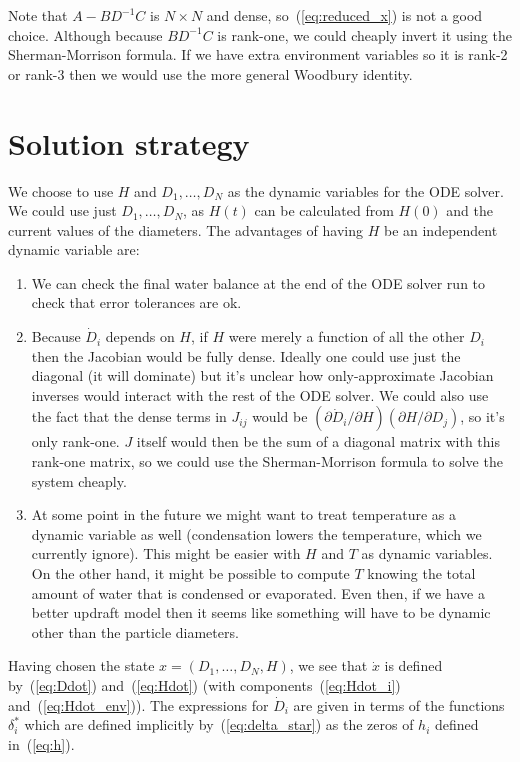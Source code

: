 \documentclass{article}
\begin{document}
Note that $A - B D^{-1} C$ is $N \times N$ and dense,
so~(\ref{eq:reduced_x}) is not a good choice. Although because $B
D^{-1} C$ is rank-one, we could cheaply invert it using the
Sherman-Morrison formula. If we have extra environment variables so it
is rank-2 or rank-3 then we would use the more general Woodbury
identity.

\section{Solution strategy}
\label{sec:solution-strategy}

We choose to use $H$ and $D_1,\ldots,D_N$ as the dynamic variables for
the ODE solver. We could use just $D_1,\ldots,D_N$, as $H(t)$ can be
calculated from $H(0)$ and the current values of the diameters. The
advantages of having $H$ be an independent dynamic variable are:
\begin{enumerate}
\item We can check the final water balance at the end of the ODE
  solver run to check that error tolerances are ok.
\item Because $\dot{D}_i$ depends on $H$, if $H$ were merely a
  function of all the other $D_i$ then the Jacobian would be fully
  dense. Ideally one could use just the diagonal (it will dominate)
  but it's unclear how only-approximate Jacobian inverses would
  interact with the rest of the ODE solver. We could also use the fact
  that the dense terms in $J_{ij}$ would be $(\partial \dot{D}_i
  / \partial H) (\partial H / \partial D_j)$, so it's only
  rank-one. $J$ itself would then be the sum of a diagonal matrix with
  this rank-one matrix, so we could use the Sherman-Morrison formula
  to solve the system cheaply.
\item At some point in the future we might want to treat temperature
  as a dynamic variable as well (condensation lowers the temperature,
  which we currently ignore). This might be easier with $H$ and $T$ as
  dynamic variables. On the other hand, it might be possible to
  compute $T$ knowing the total amount of water that is condensed or
  evaporated. Even then, if we have a better updraft model then it
  seems like something will have to be dynamic other than the particle
  diameters.
\end{enumerate}

Having chosen the state $x = (D_1,\ldots,D_N,H)$, we see that
$\dot{x}$ is defined by~(\ref{eq:Ddot}) and~(\ref{eq:Hdot}) (with
components~(\ref{eq:Hdot_i}) and~(\ref{eq:Hdot_env})). The expressions
for $\dot{D}_i$ are given in terms of the functions $\delta_i^*$ which
are defined implicitly by~(\ref{eq:delta_star}) as the zeros of $h_i$
defined in~(\ref{eq:h}).
\end{document}
